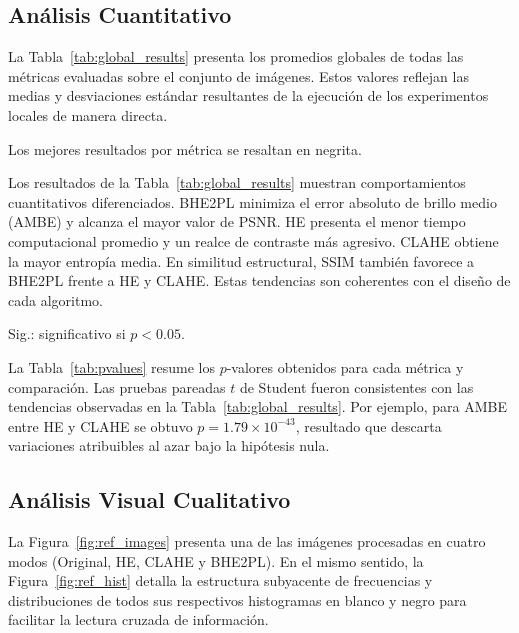 \documentclass[journal,10pt,twocolumn]{IEEEtran}
\begin{document}
\subsection{Análisis Cuantitativo}
La Tabla~\ref{tab:global_results} presenta los promedios globales de todas las métricas evaluadas sobre el conjunto de imágenes. Estos valores reflejan las medias y desviaciones estándar resultantes de la ejecución de los experimentos locales de manera directa.

\begin{table}[H]
	\caption{Promedios globales (media $\pm$ desvío estándar) para 300 imágenes locales}
	\label{tab:global_results}
	\centering
	\resizebox{\columnwidth}{!}{%
		
	}
	\vspace{2pt}
	\footnotesize{Los mejores resultados por métrica se resaltan en negrita.}
\end{table}

Los resultados de la Tabla~\ref{tab:global_results} muestran comportamientos cuantitativos diferenciados. BHE2PL minimiza el error absoluto de brillo medio (AMBE) y alcanza el mayor valor de PSNR. HE presenta el menor tiempo computacional promedio y un realce de contraste más agresivo. CLAHE obtiene la mayor entropía media. En similitud estructural, SSIM también favorece a BHE2PL frente a HE y CLAHE. Estas tendencias son coherentes con el diseño de cada algoritmo.

\begin{table}[H]
	\caption{Pruebas t pareadas para métricas clave ($\alpha=0.05$)}
	\label{tab:pvalues}
	\centering
	\resizebox{\columnwidth}{!}{%
		
	}
	\vspace{2pt}
	\footnotesize{Sig.: significativo si $p<0.05$.}
\end{table}

La Tabla~\ref{tab:pvalues} resume los $p$-valores obtenidos para cada métrica y comparación. Las pruebas pareadas $t$ de Student fueron consistentes con las tendencias observadas en la Tabla~\ref{tab:global_results}. Por ejemplo, para AMBE entre HE y CLAHE se obtuvo $p=1.79\times10^{-43}$, resultado que descarta variaciones atribuibles al azar bajo la hipótesis nula.

\subsection{Análisis Visual Cualitativo}
La Figura~\ref{fig:ref_images} presenta una de las imágenes procesadas en cuatro modos (Original, HE, CLAHE y BHE2PL). En el mismo sentido, la Figura~\ref{fig:ref_hist} detalla la estructura subyacente de frecuencias y distribuciones de todos sus respectivos histogramas en blanco y negro para facilitar la lectura cruzada de información.
\end{document}
